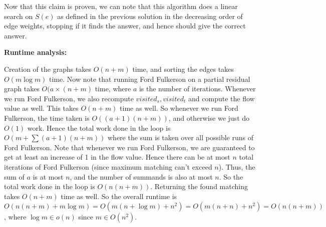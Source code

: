 \documentclass[answers]{exam}
\begin{document}
\begin{questions}
\begin{solution}
    Now that this claim is proven, we can note that this algorithm does a linear search on $S(e)$ as defined in the previous solution in the decreasing order of edge weights, stopping if it finds the
    answer, and hence should give the correct answer.

    \textbf{Runtime analysis:}

    Creation of the graphs takes $O(n + m)$ time, and sorting the edges takes $O(m \log m)$ time. Now note that running Ford Fulkerson on a partial residual graph takes $O(a \times (n + m)$ time,
    where $a$ is the number of iterations. Whenever we run Ford Fulkerson, we also recompute $visited_s, visited_t$ and compute the flow value as well. This takes $O(n + m)$ time as well. So
    whenever we run Ford Fulkerson, the time taken is $O((a + 1)(n + m))$, and otherwise we just do $O(1)$ work. Hence the total work done in the loop is $O(m + \sum(a + 1)(n + m))$ where the sum is taken over
    all possible runs of Ford Fulkerson. Note that whenever we run Ford Fulkerson, we are guaranteed to get at least an increase of 1 in the flow value. Hence there can be at most $n$ total
    iterations of Ford Fulkerson (since maximum matching can't exceed $n$). Thus, the sum of $a$ is at most $n$, and the number of summands is also at most $n$. So the total work done in the loop is
    $O(n (n + m))$. Returning the found matching takes $O(n + m)$ time as well. So the overall runtime is $O(n(n + m) + m \log m) = O(m(n + \log m) + n^2) = O(m(n + n) + n^2) = O(n(n + m))$,
    where $\log m \in o(n)$ since $m \in O(n^2)$.

\end{solution}

\end{questions}
\end{document}
